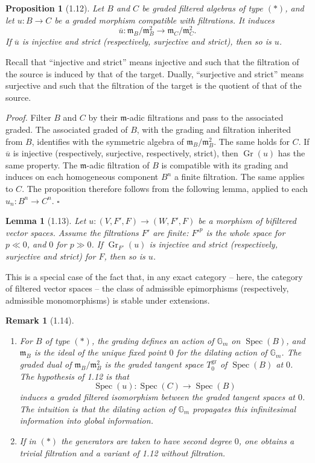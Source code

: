 \documentclass[10pt,a4paper]{article}
\newcommand{\Gm}{\mathbb G_m}
\newcommand{\Spec}{\operatorname{Spec}}
\newcommand{\Gr}{\operatorname{Gr}}
\newcommand{\m}{\mathfrak m}
\theoremstyle{deligne}
\newtheorem*{proposition*}{Proposition}
\newtheorem*{lemma*}{Lemma}
\newtheorem*{remark*}{Remark}
\newenvironment{proofdel}{\textit{Proof.}}{\hfill$\square$}
\begin{document}
\begin{proposition*}[1.12]
Let \(B\) and \(C\) be graded filtered algebras of type \((*)\), and let \(u:B\to C\) be a graded morphism compatible with filtrations. It induces
\[
\overline u:\m_B/\m_B^2\longrightarrow \m_C/\m_C^2.
\]
If \(\overline u\) is injective and strict (respectively, surjective and strict), then so is \(u\).
\end{proposition*}

Recall that ``injective and strict'' means injective and such that the filtration of the source is induced by that of the target. Dually, ``surjective and strict'' means surjective and such that the filtration of the target is the quotient of that of the source.

\begin{proofdel}
Filter \(B\) and \(C\) by their \(\m\)-adic filtrations and pass to the associated graded. The associated graded of \(B\), with the grading and filtration inherited from \(B\), identifies with the symmetric algebra of \(\m_B/\m_B^2\). The same holds for \(C\). If \(\overline u\) is injective (respectively, surjective, respectively, strict), then \(\Gr(u)\) has the same property. The \(\m\)-adic filtration of \(B\) is compatible with its grading and induces on each homogeneous component \(B^n\) a finite filtration. The same applies to \(C\). The proposition therefore follows from the following lemma, applied to each \(u_n:B^n\to C^n\).
\end{proofdel}

\begin{lemma*}[1.13]
Let \(u:(V,F',F)\to(W,F',F)\) be a morphism of bifiltered vector spaces. Assume the filtrations \(F'\) are finite: \(F'^p\) is the whole space for \(p\ll0\), and \(0\) for \(p\gg0\). If \(\Gr_{F'}(u)\) is injective and strict (respectively, surjective and strict) for \(F\), then so is \(u\).
\end{lemma*}

This is a special case of the fact that, in any exact category -- here, the category of filtered vector spaces -- the class of admissible epimorphisms (respectively, admissible monomorphisms) is stable under extensions.

\begin{remark*}[1.14]
\begin{enumerate}[label=(\roman*)]
\item For \(B\) of type \((*)\), the grading defines an action of \(\Gm\) on \(\Spec(B)\), and \(\m_B\) is the ideal of the unique fixed point \(0\) for the dilating action of \(\Gm\). The graded dual of \(\m_B/\m_B^2\) is the graded tangent space \(T^{\mathrm{gr}}_0\) of \(\Spec(B)\) at \(0\). The hypothesis of 1.12 is that
\[
\Spec(u):\Spec(C)\longrightarrow\Spec(B)
\]
induces a graded filtered isomorphism between the graded tangent spaces at \(0\). The intuition is that the dilating action of \(\Gm\) propagates this infinitesimal information into global information.
\item If in \((*)\) the generators are taken to have second degree \(0\), one obtains a trivial filtration and a variant of 1.12 without filtration.
\end{enumerate}
\end{remark*}
\end{document}
